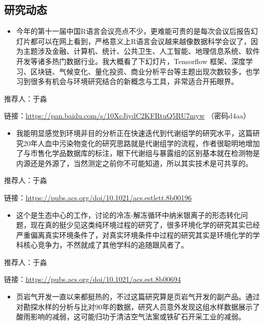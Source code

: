 \documentclass[
]{book}
\providecommand{\tightlist}{%
  \setlength{\itemsep}{0pt}\setlength{\parskip}{0pt}}
\begin{document}
\hypertarget{ux7814ux7a76ux52a8ux6001-7}{%
\subsection*{研究动态}\label{ux7814ux7a76ux52a8ux6001-7}}

\begin{itemize}
\tightlist
\item
  今年的第十一届中国R语言会议亮点不少，更难能可贵的是每次会议后报告幻灯片都可以在网上看到，严格意义上R语言会议越来越像数据科学会议了，因为主题涉及金融、计算机、统计、公共卫生、人工智能、地理信息系统、软件开发等诸多热门数据行业。我大概看了下幻灯片，Tensorflow 框架、深度学习、区块链、气候变化、量化投资、商业分析平台等主题出现次数较多，也学习到很多有机会与环境研究结合的新概念与工具，非常适合开拓眼界。
\end{itemize}

推荐人：于淼

链接：\url{https://pan.baidu.com/s/10XcJiydC2KFRtuQ5RU7myw} （密码d4aa）

\begin{itemize}
\tightlist
\item
  我能明显感觉到环境非目的分析正在快速迭代到代谢组学的研究水平，这篇研究20年人血中污染物变化的研究思路就是代谢组学的流程，作者很聪明地增加了与市售化学品数据库的标注，眼下代谢组与暴露组的区别基本就在检测物是内源还是外源了，当然测定之前你不可能知道，所以其实技术是可共享的。
\end{itemize}

推荐人：于淼

链接：\url{https://pubs.acs.org/doi/10.1021/acs.estlett.8b00196}

\begin{itemize}
\tightlist
\item
  这个是生态中心的工作，讨论的冷冻-解冻循环中纳米银离子的形态转化问题，现在真的挺少见这类纯环境过程的研究了，很多环境化学的研究其实已经严重偏离真实环境条件了，对真实环境条件中过程的研究其实是环境化学的学科核心竞争力，不然就成了其他学科的追随跟风者了。
\end{itemize}

推荐人：于淼

链接：\url{https://pubs.acs.org/doi/10.1021/acs.est.8b00694}

\begin{itemize}
\tightlist
\item
  页岩气开发一直以来都挺热的，不过这篇研究算是页岩气开发的副产品。通过对勘探水样的分析与比对90年的数据，研究人员意外发现这组水样数据展示了酸雨影响的减弱，这可能归功于清洁空气法案或铁矿石开采工业的减弱。
\end{itemize}
\end{document}
